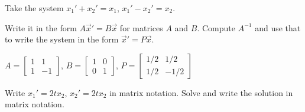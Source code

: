 \begin{exercise}
Take the system $x_1' + x_2' = x_1$,
$x_1' - x_2' = x_2$.
\begin{tasks}
\task Write it in the form
$A {\vec{x}}' = B \vec{x}$ for matrices $A$ and $B$.
\task Compute $A^{-1}$ and use that to write the system in the form
${\vec{x}}' = P \vec{x}$.
\end{tasks}
\end{exercise}
\comboSol{%
}
{%
$A = \left[\begin{smallmatrix}  1 & 1 \\ 1 & -1 \end{smallmatrix}\right]$, $B = \left[\begin{smallmatrix} 1 & 0 \\ 0 & 1 \end{smallmatrix}\right]$, $P = \left[\begin{smallmatrix} 1/2 & 1/2 \\ 1/2 & -1/2 \end{smallmatrix}\right]$
}

\begin{exercise}\ansMark%
\leavevmode
\begin{tasks}
\task Write $x_1'=2tx_2$, $x_2'=2tx_2$ in matrix notation.
\task Solve and write
the solution in matrix notation.
\end{tasks}
\end{exercise}

\setcounter{exercise}{100}

